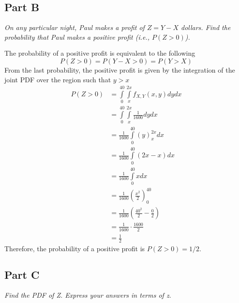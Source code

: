 \documentclass{article}
\begin{document}
\subsection*{Part B}

\textit{On any particular night, Paul makes a profit of $ Z = Y - X $ dollars.
Find the probability that Paul makes a positive profit (i.e., $ P(Z > 0)$). }

\bigbreak

The probability of a positive profit is equivalent to the following
$$ P(Z > 0) = P(Y - X > 0) = P(Y > X) $$
From the last probability, the positive profit is given by the integration of
the joint PDF over the region such that $ y > x $
\begin{align*}
    P(Z > 0) &= \int\limits_0^{40} \int\limits_x^{2x} f_{X,Y}(x, y) dy dx \\
    &= \int\limits_0^{40} \int\limits_x^{2x} \frac{1}{1600} dy dx \\
    &= \frac{1}{1600} \int\limits_0^{40} \left( y \right)_x^{2x} dx \\
    &= \frac{1}{1600} \int\limits_0^{40} \left( 2x - x \right) dx \\
    &= \frac{1}{1600} \int\limits_0^{40} x dx \\
    &= \frac{1}{1600} \left( \frac{x^2}{2} \right)_0^{40} \\
    &= \frac{1}{1600} \left( \frac{40^2}{2} - \frac{0}{2} \right) \\
    &= \frac{1}{1600} \cdot \frac{1600}{2} \\
    &= \frac{1}{2}
\end{align*}
Therefore, the probability of a positive profit is $ P(Z > 0) = 1/2 $.

\subsection*{Part C}

\textit{Find the PDF of Z. Express your answers in terms of z.}

\bigbreak
\end{document}
